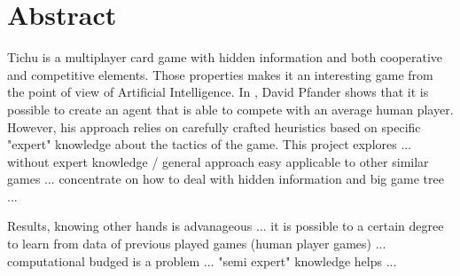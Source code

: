 
\section*{Abstract}
Tichu is a multiplayer card game with hidden information and both cooperative and competitive elements.
Those properties makes it an interesting game from the point of view of Artificial Intelligence. In \cite{david12}, David Pfander shows that it is possible to create an agent that is able to compete with an average human player. However, his approach relies on carefully crafted heuristics based on specific "expert" knowledge about the tactics of the game.
This project explores ... without expert knowledge / general approach easy applicable to other similar games ... concentrate on how to deal with hidden information and big game tree ...

Results, knowing other hands is advanageous ... it is possible to a certain degree to learn from data of previous played games (human player games) ... computational budged is a problem ... "semi expert" knowledge helps ... 


\vskip0.5cm
